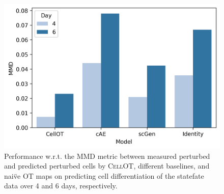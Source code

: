 \begin{figure}[H]
    \centering
    \includegraphics[width=.5\textwidth]{figures/cellot-methods/Bunne_Supp_Fig12.png}
    \caption{Performance w.r.t. the MMD metric between measured perturbed and predicted perturbed cells by \textsc{CellOT}, different baselines, and nai\"ve OT maps on predicting cell differentiation of the statefate data over 4 and 6 days, respectively.
    }\label{supp_fig:statefate_days_all_methods}
\end{figure}




%
%
%
